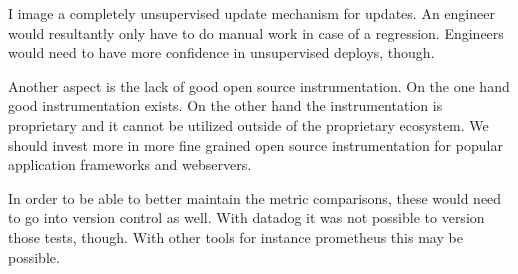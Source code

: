 I image a completely unsupervised update mechanism for updates. An engineer would
resultantly only have to do manual work in case of a regression. Engineers would need to
have more confidence in unsupervised deploys, though.

Another aspect is the lack of good open source instrumentation. On the one hand good
instrumentation exists. On the other hand the instrumentation is proprietary and it cannot
be utilized outside of the proprietary ecosystem. We should invest more in more fine
grained open source instrumentation for popular application frameworks and webservers.

In order to be able to better maintain the metric comparisons, these would need to go into
version control as well. With datadog it was not possible to version those tests,
though. With other tools for instance prometheus this may be possible.
